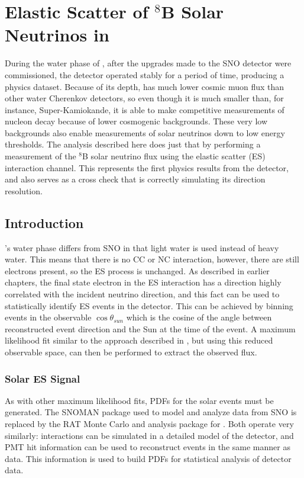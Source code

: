 \chapter{Elastic Scatter of $^8$B Solar Neutrinos in {\snop}}
\label{ch:es}

During the water phase of {\snop}, after the upgrades made to the SNO detector were commissioned, the detector operated stably for a period of time, producing a physics dataset.
Because of its depth, {\snop} has much lower cosmic muon flux than other water Cherenkov detectors, so even though it is much smaller than, for instance, Super-Kamiokande, it is able to make competitive measurements of nucleon decay \cite{nucleon_decay} because of lower cosmogenic backgrounds.
These very low backgrounds also enable measurements of solar neutrinos down to low energy thresholds.
The analysis described here does just that by performing a measurement of the $^8$B solar neutrino flux using the elastic scatter (ES) interaction channel.
This represents the first physics results from the {\snop} detector, and also serves as a cross check that {\snop} is correctly simulating its direction resolution.

\section{Introduction}
\label{sec:solar:intro}

{\snop}'s water phase differs from SNO in that light water is used instead of heavy water.
This means that there is no CC or NC interaction, however, there are still electrons present, so the ES process is unchanged.
As described in earlier chapters, the final state electron in the ES interaction has a direction highly correlated with the incident neutrino direction, and this fact can be used to statistically identify ES events in the detector.
This can be achieved by binning events in the observable $\cos{\theta_{sun}}$ which is the cosine of the angle between reconstructed event direction and the Sun at the time of the event.
A maximum likelihood fit similar to the approach described in , but using this reduced observable space, can then be performed to extract the observed flux.

\subsection{Solar ES Signal}
\label{sec:solar:inputs}

As with other maximum likelihood fits, PDFs for the solar events must be generated.
The SNOMAN package used to model and analyze data from SNO is replaced by the RAT Monte Carlo and analysis package for {\snop}.
Both operate very similarly: interactions can be simulated in a detailed model of the detector, and PMT hit information can be used to reconstruct events in the same manner as data.
This information is used to build PDFs for statistical analysis of detector data.

